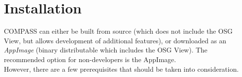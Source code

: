 \chapter{Installation}
\label{sec:installation}

COMPASS can either be built from source (which does not include the OSG View, but allows development of additional features), or downloaded as an \textit{AppImage} (binary distributable which includes the OSG View). The recommended option for non-developers is the AppImage. \\

However, there are a few prerequisites that should be taken into consideration.












